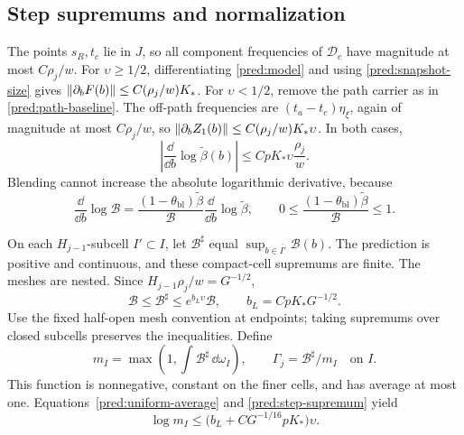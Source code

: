 \subsection{Step supremums and normalization}

The points \(s_R,t_c\) lie in \(J\), so all component frequencies
of \(\mathcal D_c\) have magnitude at most \(C\rho_j/w\).
For \(\upsilon\ge1/2\), differentiating \eqref{pred:model} and using
\eqref{pred:snapshot-size} gives
\(\left\|\partial_b F(b)\right\|\le C(\rho_j/w)K_*\).
For \(\upsilon<1/2\), remove the path carrier as in
\eqref{pred:path-baseline}. The off-path frequencies are
\((t_a-t_c)\eta_\xi\), again of magnitude at most \(C\rho_j/w\), so
\(\left\|\partial_b Z_1(b)\right\|\le C(\rho_j/w)K_*\upsilon\).
In both cases,
\[
 \left|\frac{\dd}{\dd b}\log\widetilde\beta(b)\right|
       \le CpK_*\upsilon\frac{\rho_j}{w}.
\]
Blending cannot increase the absolute logarithmic derivative, because
\[
 \frac{\dd}{\dd b}\log \mathcal B
   =\frac{(1-\theta_{\mathrm{bl}})\widetilde\beta}{\mathcal B}
               \frac{\dd}{\dd b}\log\widetilde\beta,\qquad
 0\le\frac{(1-\theta_{\mathrm{bl}})\widetilde\beta}{\mathcal B}\le1.
\]

On each \(H_{j-1}\)-subcell \(I'\subset I\), let \(\mathcal B^\sharp\) equal
\(\sup_{b\in\overline{I'}}\mathcal B(b)\).
The prediction is positive and continuous, and these compact-cell
supremums are finite. The meshes are nested. Since
\(H_{j-1}\rho_j/w=G^{-1/2}\),
\begin{equation}
 \mathcal B\le \mathcal B^\sharp\le e^{b_L\upsilon}\mathcal B,\qquad
 b_L=CpK_*G^{-1/2}.
 \label{pred:step-supremum}
\end{equation}
Use the fixed half-open mesh convention at endpoints; taking
supremums over closed subcells preserves the inequalities.
Define
\begin{equation}
 m_I=\max\left(1,\int \mathcal B^\sharp\,\dd\omega_I\right),\qquad
 \Gamma_j=\mathcal B^\sharp/m_I\quad\text{on }I.
 \label{pred:gamma-normalization}
\end{equation}
This function is nonnegative, constant on the finer cells, and has
average at most one. Equations~\eqref{pred:uniform-average} and
\eqref{pred:step-supremum} yield
\begin{equation}
 \log m_I\le\bigl(b_L+CG^{-1/16}pK_*\bigr)\upsilon.
 \label{pred:normalization-cost}
\end{equation}

